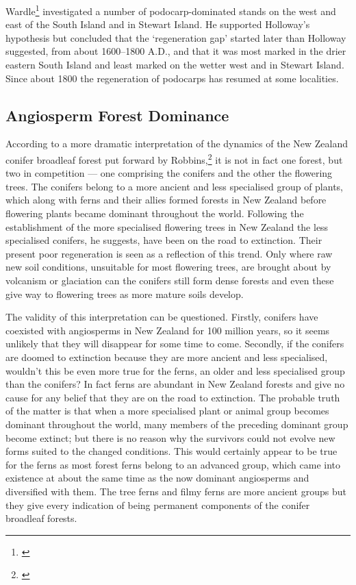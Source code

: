 Wardle\footnote{\cite{wardle1963regeneration}} investigated a number of podocarp-dominated stands on the west and east of the South Island and in Stewart Island.
He supported Holloway's hypothesis but concluded that the `regeneration gap' started later than Holloway suggested, from about 1600--1800 A.D., and that it was most marked in the drier eastern South Island and least marked on the wetter west and in Stewart Island.
Since about 1800 the regeneration of podocarps has resumed at some localities.

\subsection{Angiosperm Forest Dominance}

According to a more dramatic interpretation of the dynamics of the New Zealand conifer broadleaf forest put forward by Robbins,\footnote{\cite{robbins1962podocarp}} it is not in fact one forest, but two in competition --- one comprising the conifers and the other the flowering trees.
The conifers belong to a more ancient and less specialised group of plants, which along with ferns and their allies formed forests in New Zealand before flowering plants became dominant throughout the world.
Following the establishment of the more specialised flowering trees in New Zealand the less specialised conifers, he suggests, have been on the road to extinction.
Their present poor regeneration is seen as a reflection of this trend.
Only where raw new soil conditions, unsuitable for most flowering trees, are brought about by volcanism or glaciation can the conifers still form dense forests and even these give way to flowering trees as more mature soils develop.

The validity of this interpretation can be questioned.
Firstly, conifers have coexisted with angiosperms in New Zealand for 100 million years, so it seems unlikely that they will disappear for some time to come.
Secondly, if the conifers are doomed to extinction because they are more ancient and less specialised, wouldn't this be even more true for the ferns, an older and less specialised group than the conifers? In fact ferns are abundant in New Zealand forests and give no cause for any belief that they are on the road to extinction.
The probable truth of the matter is that when a more specialised plant or animal group becomes dominant throughout the world, many members of the preceding dominant group become extinct; but there is no reason why the survivors could not evolve new forms suited to the changed conditions.
This would certainly appear to be true for the ferns as most forest ferns belong to an advanced group, which came into existence at about the same time as the now dominant angiosperms and diversified with them.
The tree ferns and filmy ferns are more ancient groups but they give every indication of being permanent components of the conifer broadleaf forests.

